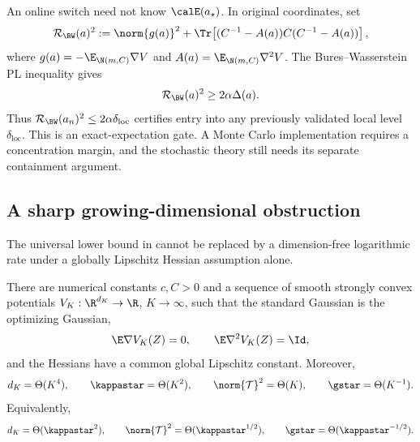 An online switch need not know \(\calE(a_\star)\).  In original coordinates,
set
\begin{equation}
  \mathcal R_{\BW}(a)^2
  :=
  \norm{g(a)}^2+
  \Tr\!\left[
    (C^{-1}-A(a))C(C^{-1}-A(a))
  \right],
  \label{eq:local-bw-residual}
\end{equation}
where \(g(a)=-\E_{\N(m,C)}\nabla V\) and
\(A(a)=\E_{\N(m,C)}\nabla^2V\).
The Bures--Wasserstein PL inequality gives
\begin{equation}
  \mathcal R_{\BW}(a)^2\geq2\alpha\Delta(a).
  \label{eq:local-bw-gate}
\end{equation}
Thus
\(\mathcal R_{\BW}(a_n)^2\leq2\alpha\delta_{\mathrm{loc}}\)
certifies entry into any previously validated local level
\(\delta_{\mathrm{loc}}\).  This is an exact-expectation gate.  A Monte Carlo
implementation requires a concentration margin, and the stochastic theory
still needs its separate containment argument.

\subsection{A sharp growing-dimensional obstruction}
\label{sec:local-ridge}

The universal lower bound in
 cannot be replaced by a
dimension-free logarithmic rate under a globally Lipschitz Hessian assumption
alone.

\begin{theorem}
\label{thm:local-ridge-obstruction}
There are numerical constants \(c,C>0\) and a sequence of smooth strongly
convex potentials \(V_K:\R^{d_K}\to\R\), \(K\to\infty\), such that the
standard Gaussian is the optimizing Gaussian,
\[
  \E\nabla V_K(Z)=0,\qquad
  \E\nabla^2V_K(Z)=\Id,
\]
and the Hessians have a common global Lipschitz constant.  Moreover,
\begin{equation}
  d_K=\Theta(K^4),\qquad
  \kappastar=\Theta(K^2),\qquad
  \norm{\mathcal T}^2=\Theta(K),
  \qquad
  \gstar=\Theta(K^{-1}).
  \label{eq:local-ridge-scaling}
\end{equation}
Equivalently,
\[
  d_K=\Theta(\kappastar^2),\qquad
  \norm{\mathcal T}^2=\Theta(\kappastar^{1/2}),
  \qquad
  \gstar=\Theta(\kappastar^{-1/2}).
\]
\end{theorem}

